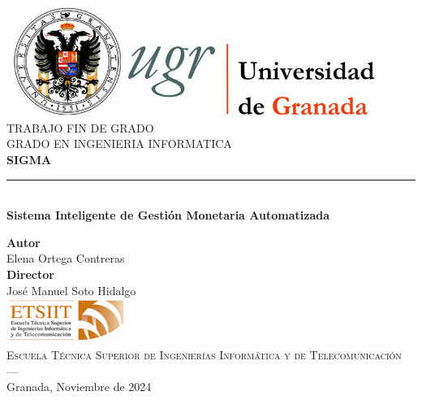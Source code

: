 \begin{titlepage}
    \newlength{\centeroffset}
    \setlength{\centeroffset}{-0.5\oddsidemargin}
    \addtolength{\centeroffset}{0.5\evensidemargin}
    \thispagestyle{empty}
    
    \noindent\hspace*{\centeroffset}
    \begin{minipage}{\textwidth}
    
    \centering
    \includegraphics[width=0.9\textwidth]{logos/logo_ugr.jpg}\\[1.4cm]
    
    \textsc{ \Large TRABAJO FIN DE GRADO\\[0.2cm]}
    \textsc{ GRADO EN INGENIERIA INFORMATICA}\\[1cm]
    
    {\Huge\bfseries SIGMA \\}
    \noindent\rule[-1ex]{\textwidth}{3pt}\\[3.5ex]
    {\large\bfseries Sistema Inteligente de Gestión Monetaria Automatizada }
    \end{minipage}
    
    \vspace{2.5cm}
    \noindent\hspace*{\centeroffset}
    \begin{minipage}{\textwidth}
    \centering
    
    \textbf{Autor}\\ {Elena Ortega Contreras}\\[2.5ex]
    \textbf{Director}\\ {José Manuel Soto Hidalgo}\\[2cm]
    \includegraphics[width=0.3\textwidth]{logos/etsiit_logo.png}\\[0.1cm]
    \textsc{Escuela Técnica Superior de Ingenierías Informática y de Telecomunicación}\\
    \textsc{---}\\
    Granada, Noviembre de 2024
    \end{minipage}
    \end{titlepage}